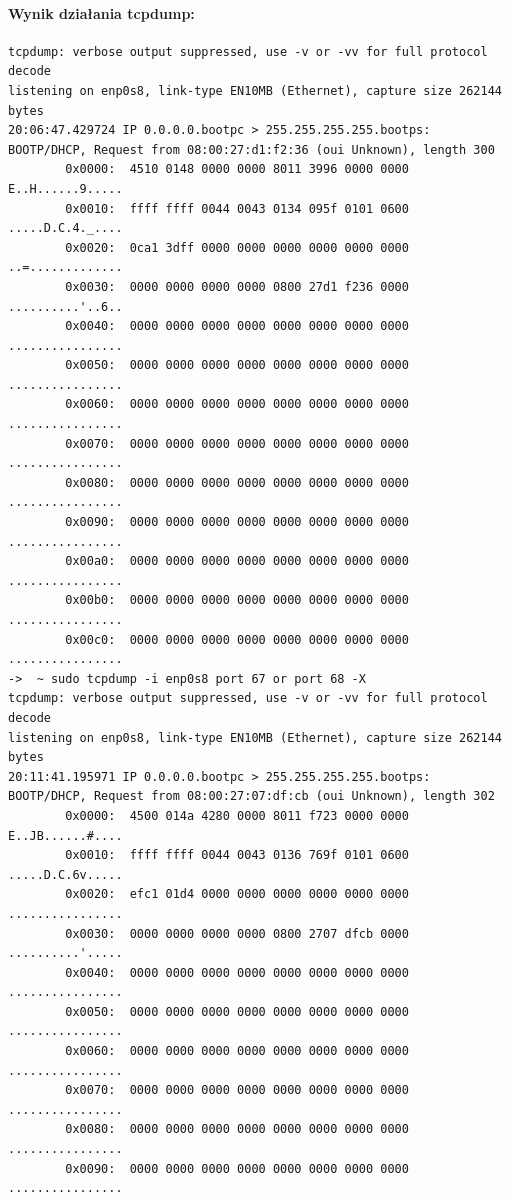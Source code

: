 \documentclass{mwart} %
\begin{document}
\paragraph{Wynik działania tcpdump:}
\begin{footnotesize}
\begin{verbatim}
tcpdump: verbose output suppressed, use -v or -vv for full protocol decode 
listening on enp0s8, link-type EN10MB (Ethernet), capture size 262144 bytes
20:06:47.429724 IP 0.0.0.0.bootpc > 255.255.255.255.bootps: BOOTP/DHCP, Request from 08:00:27:d1:f2:36 (oui Unknown), length 300 
        0x0000:  4510 0148 0000 0000 8011 3996 0000 0000  E..H......9.....
        0x0010:  ffff ffff 0044 0043 0134 095f 0101 0600  .....D.C.4._....
        0x0020:  0ca1 3dff 0000 0000 0000 0000 0000 0000  ..=.............
        0x0030:  0000 0000 0000 0000 0800 27d1 f236 0000  ..........'..6..
        0x0040:  0000 0000 0000 0000 0000 0000 0000 0000  ................
        0x0050:  0000 0000 0000 0000 0000 0000 0000 0000  ................
        0x0060:  0000 0000 0000 0000 0000 0000 0000 0000  ................
        0x0070:  0000 0000 0000 0000 0000 0000 0000 0000  ................
        0x0080:  0000 0000 0000 0000 0000 0000 0000 0000  ................
        0x0090:  0000 0000 0000 0000 0000 0000 0000 0000  ................
        0x00a0:  0000 0000 0000 0000 0000 0000 0000 0000  ................
        0x00b0:  0000 0000 0000 0000 0000 0000 0000 0000  ................
        0x00c0:  0000 0000 0000 0000 0000 0000 0000 0000  ................
->  ~ sudo tcpdump -i enp0s8 port 67 or port 68 -X 
tcpdump: verbose output suppressed, use -v or -vv for full protocol decode  
listening on enp0s8, link-type EN10MB (Ethernet), capture size 262144 bytes 
20:11:41.195971 IP 0.0.0.0.bootpc > 255.255.255.255.bootps: BOOTP/DHCP, Request from 08:00:27:07:df:cb (oui Unknown), length 302 
        0x0000:  4500 014a 4280 0000 8011 f723 0000 0000  E..JB......#....
        0x0010:  ffff ffff 0044 0043 0136 769f 0101 0600  .....D.C.6v.....
        0x0020:  efc1 01d4 0000 0000 0000 0000 0000 0000  ................
        0x0030:  0000 0000 0000 0000 0800 2707 dfcb 0000  ..........'.....
        0x0040:  0000 0000 0000 0000 0000 0000 0000 0000  ................
        0x0050:  0000 0000 0000 0000 0000 0000 0000 0000  ................
        0x0060:  0000 0000 0000 0000 0000 0000 0000 0000  ................
        0x0070:  0000 0000 0000 0000 0000 0000 0000 0000  ................
        0x0080:  0000 0000 0000 0000 0000 0000 0000 0000  ................
        0x0090:  0000 0000 0000 0000 0000 0000 0000 0000  ................

\end{verbatim}
\end{footnotesize}
\end{document}
